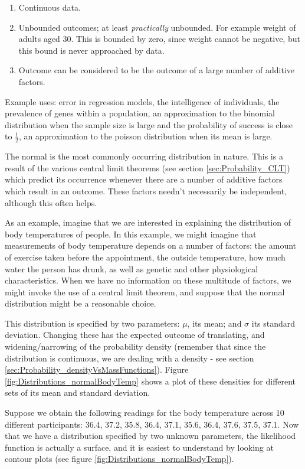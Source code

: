 \documentclass[11pt,fullpage]{book}
\begin{document}
\begin{enumerate} 
\item Continuous data.
\item Unbounded outcomes; at least \textit{practically} unbounded. For example weight of adults aged 30. This is bounded by zero, since weight cannot be negative, but this bound is never approached by data.
\item Outcome can be considered to be the outcome of a large number of additive factors.
\end{enumerate}

Example uses: error in regression models, the intelligence of individuals, the prevalence of genes within a population, an approximation to the binomial distribution when the sample size is large and the probability of success is close to $\frac{1}{2}$, an approximation to the poisson distribution when its mean is large.

The normal is the most commonly occurring distribution in nature. This is a result of the various central limit theorems (see section \ref{sec:Probability_CLT}) which predict its occurrence whenever there are a number of additive factors which result in an outcome. These factors needn't necessarily be independent, although this often helps.

As an example, imagine that we are interested in explaining the distribution of body temperatures of people. In this example, we might imagine that measurements of body temperature depends on a number of factors: the amount of exercise taken before the appointment, the outside temperature, how much water the person has drunk, as well as genetic and other physiological characteristics. When we have no information on these multitude of factors, we might invoke the use of a central limit theorem, and suppose that the normal distribution might be a reasonable choice.

This distribution is specified by two parameters: $\mu$, its mean; and $\sigma$ its standard deviation. Changing these has the expected outcome of translating, and widening/narrowing of the probability density (remember that since the distribution is continuous, we are dealing with a density - see section \ref{sec:Probability_densityVsMassFunctions}). Figure \ref{fig:Distributions_normalBodyTemp} shows a plot of these densities for different sets of its mean and standard deviation.

Suppose we obtain the following readings for the body temperature across 10 different participants: {36.4, 37.2, 35.8, 36.4, 37.1, 35.6, 36.4, 37.6, 37.5, 37.1}. Now that we have a distribution specified by two unknown parameters, the likelihood function is actually a surface, and it is easiest to understand by looking at contour plots (see figure \ref{fig:Distributions_normalBodyTemp}). 
\end{document}
